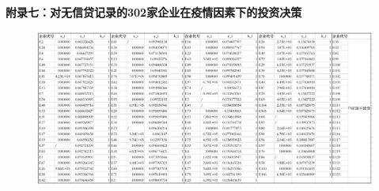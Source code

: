 \documentclass[bwprint]{cumcm}
\begin{document}
\begin{appendices}
\newpage
 \noindent \textbf{附录七：对无信贷记录的302家企业在疫情因素下的投资决策}
 \begin{figure}[h]%
	\centering  %
	\includegraphics[width=1\linewidth]{figures/T3.jpg}  %
	\label{fig:mcmthesis-logo}   %
\end{figure}
\end{appendices}




 


\newpage

\appendix


\end{document}
